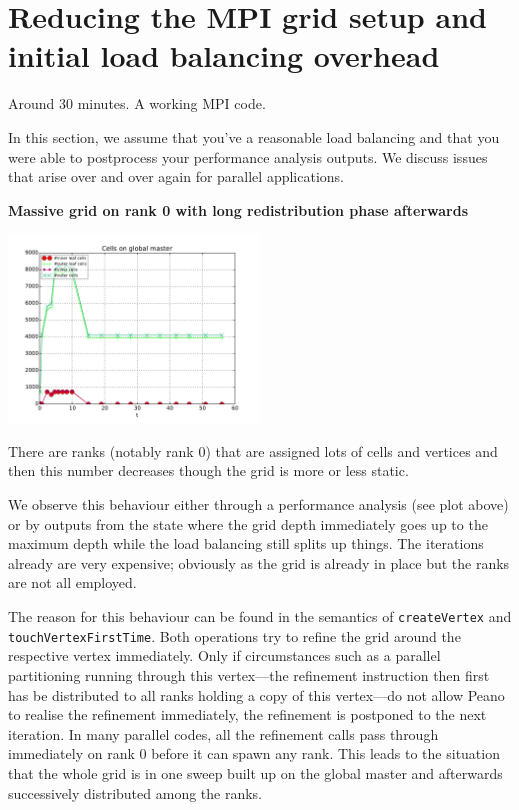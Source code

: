 \section{Reducing the MPI grid setup and initial load balancing overhead}


\chapterDescription
  {
    Around 30 minutes.
  }
  {
    A working MPI code.
  }


In this section, we assume that you've a reasonable load balancing and that you
were able to postprocess your performance analysis outputs. We discuss issues
that arise over and over again for parallel applications.


{\bf Massive grid on rank 0 with long redistribution phase afterwards}

\begin{center}
  \includegraphics[width=0.5\textwidth]{61_mpi-setup/performance-analysis-output.pdf}
\end{center}


\begin{smell}
There are ranks (notably rank 0) that are assigned lots of cells and vertices
and then this number decreases though the grid is more or less static.
\end{smell}

\noindent
We observe this behaviour either through a performance analysis (see plot above)
or by outputs from the state where the grid depth immediately goes up to the
maximum depth while the load balancing still splits up things. 
The iterations already are very expensive; obviously as the grid is already in
place but the ranks are not all employed.


The reason for this behaviour can be found in the semantics of
\texttt{createVertex} and \linebreak
\texttt{touchVertexFirstTime}.
Both operations try to refine the grid around the respective vertex immediately. 
Only if circumstances such as a parallel partitioning running through this
vertex---the refinement instruction then first has be distributed to all ranks
holding a copy of this vertex---do not allow Peano to realise the refinement
immediately, the refinement is postponed to the next iteration.
In many parallel codes, all the refinement calls pass through immediately on
rank 0 before it can spawn any rank.
This leads to the situation that the whole grid is in one sweep built up on the
global master and afterwards successively distributed among the ranks.


